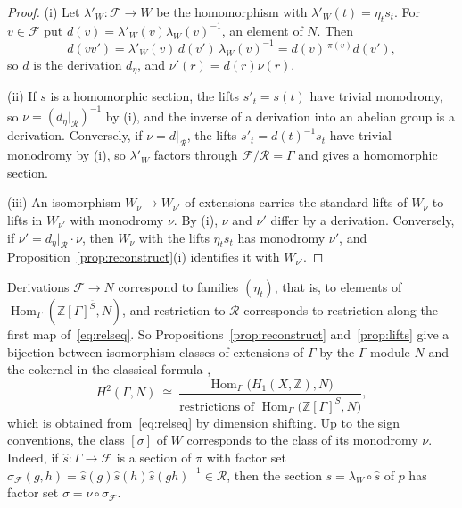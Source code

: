 \documentclass[12pt,letterpaper]{article}
\numberwithin{equation}{section}
\theoremstyle{plain}
\theoremstyle{definition}
\newcommand{\Z}{\mathbb{Z}}
\newcommand{\act}[2]{{}^{#1}\!#2}          %
\newcommand{\fr}{\mathcal{F}}             %
\newcommand{\rel}{\mathcal{R}}            %
\DeclareMathOperator{\Hom}{Hom}
\begin{document}
\begin{proof}
(i) Let $\lambda'_W:\fr\to W$ be the homomorphism with
$\lambda'_W(t)=\eta_ts_t$. For $v\in\fr$ put
$d(v)=\lambda'_W(v)\lambda_W(v)^{-1}$, an element of $N$. Then
\[
d(vv')=\lambda'_W(v)\,d(v')\,\lambda_W(v)^{-1}=d(v)\,\act{\pi(v)}{d(v')},
\]
so $d$ is the derivation $d_\eta$, and $\nu'(r)=d(r)\nu(r)$.

(ii) If $s$ is a homomorphic section, the lifts $s'_t=s(t)$ have trivial
monodromy, so $\nu=(d_\eta|_{\rel})^{-1}$ by (i), and the inverse of a
derivation into an abelian group is a derivation. Conversely, if
$\nu=d|_{\rel}$, the lifts $s'_t=d(t)^{-1}s_t$ have trivial monodromy by
(i), so $\lambda'_W$ factors through $\fr/\rel=\Gamma$ and gives a
homomorphic section.

(iii) An isomorphism $W_\nu\to W_{\nu'}$ of extensions carries the
standard lifts of $W_\nu$ to lifts in $W_{\nu'}$ with monodromy $\nu$. By
(i), $\nu$ and $\nu'$ differ by a derivation. Conversely, if
$\nu'=d_\eta|_{\rel}\cdot\nu$, then $W_\nu$ with the lifts $\eta_ts_t$ has
monodromy $\nu'$, and Proposition~\ref{prop:reconstruct}(i) identifies it
with $W_{\nu'}$.
\end{proof}

Derivations $\fr\to N$ correspond to families $(\eta_t)$, that is, to
elements of $\Hom_\Gamma(\Z[\Gamma]^{\overline{S}},N)$, and restriction to
$\rel$ corresponds to restriction along the first map
of~\eqref{eq:relseq}. So Propositions~\ref{prop:reconstruct}
and~\ref{prop:lifts} give a bijection between isomorphism classes of
extensions of $\Gamma$ by the $\Gamma$-module $N$ and the cokernel in the
classical formula \cite[Ch.~IV]{Br82}, \cite[Ch.~IV]{ML63}
\begin{equation}\label{eq:H2pres}
H^2(\Gamma,N)\ \cong\
\frac{\Hom_\Gamma\bigl(H_1(X,\Z),N\bigr)}
{\text{restrictions of }\Hom_\Gamma\bigl(\Z[\Gamma]^{\overline{S}},N\bigr)} ,
\end{equation}
which is obtained from~\eqref{eq:relseq} by dimension shifting. Up to the
sign conventions, the class $[\sigma]$ of $W$ corresponds to the class of
its monodromy $\nu$. Indeed, if $\hat{s}:\Gamma\to\fr$ is a section of
$\pi$ with factor set
$\sigma_{\fr}(g,h)=\hat{s}(g)\hat{s}(h)\hat{s}(gh)^{-1}\in\rel$, then the
section $s=\lambda_W\circ\hat{s}$ of $p$ has factor set
$\sigma=\nu\circ\sigma_{\fr}$.
\end{document}

